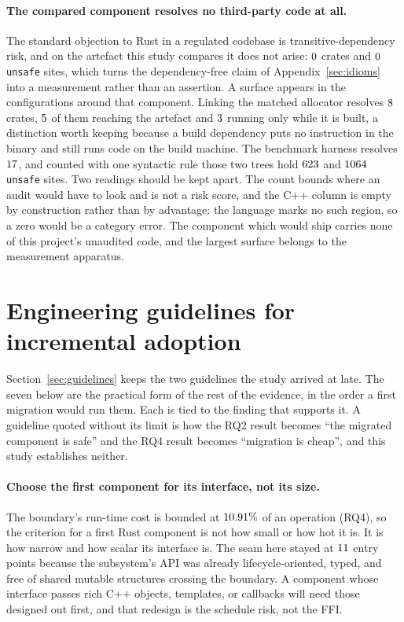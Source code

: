 \documentclass[english,oneside,a4paper,censored,csm,software-track-2020]{HYthesisML}
\begin{document}
\begin{appendices}
\paragraph{The compared component resolves no third-party code at all.}
The standard objection to Rust in a regulated codebase is transitive-dependency risk, and on the
artefact this study compares it does not arise: $0$ crates and $0$
\texttt{unsafe} sites, which turns the dependency-free claim of Appendix~\ref{sec:idioms} into a
measurement rather than an assertion. A surface appears in the configurations around that
component. Linking the matched allocator resolves $8$ crates, $5$
of them reaching the artefact and $3$ running only while it is built, a
distinction worth keeping because a build dependency puts no instruction in the binary and still
runs code on the build machine. The benchmark harness resolves $17$, and counted with
one syntactic rule those two trees hold $623$ and $1064$
\texttt{unsafe} sites. Two readings should be kept apart. The count bounds where an audit would
have to look and is not a risk score, and the C++ column is empty by construction rather than by
advantage: the language marks no such region, so a zero would be a category error. The component
which would ship carries none of this project's unaudited code, and the largest surface belongs to
the measurement apparatus.


\section{Engineering guidelines for incremental adoption\label{appendix:guidelines}}
Section~\ref{sec:guidelines} keeps the two guidelines the study arrived at late. The seven
below are the practical form of the rest of the evidence, in the order a first migration would
run them. Each is tied to the finding that supports it. A guideline quoted without its limit is
how the RQ2 result becomes ``the migrated component is safe'' and the RQ4 result becomes
``migration is cheap'', and this study establishes neither.

\paragraph{Choose the first component for its interface, not its size.}
The boundary's run-time cost is bounded at $10.91\%$ of an operation (RQ4), so the
criterion for a first Rust component is not how small or how hot it is. It is how narrow and
how scalar its interface is. The seam here stayed at $11$ entry points because the
subsystem's API was already lifecycle-oriented, typed, and free of shared mutable structures
crossing the boundary. A component whose interface passes rich C++ objects, templates, or
callbacks will need those designed out first, and that redesign is the schedule risk, not the
FFI.


\end{appendices}
\end{document}
